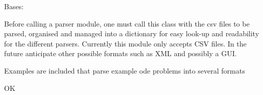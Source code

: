 \documentclass[letterpaper,10pt,english]{sphinxmanual}
\begin{document}
\begin{fulllineitems}
\label{eqparse:eqparse.createlibrary.CreateLibrary}
Bases: 

Before calling a parser module, one must call this class with the csv
files to be parsed, organised and managed into a dictionary for easy look-up
and readability for the different parsers. Currently this module only accepts 
CSV files. In the future anticipate other possible formats such as XML and
possibly a GUI.

Examples are included that parse example ode problems into several formats

OK

\begin{fulllineitems}
\label{eqparse:eqparse.createlibrary.CreateLibrary.add_index}
\end{fulllineitems}


\begin{fulllineitems}
\label{eqparse:eqparse.createlibrary.CreateLibrary.add_variable}
\end{fulllineitems}


\begin{fulllineitems}
\label{eqparse:eqparse.createlibrary.CreateLibrary.change_variable}
\end{fulllineitems}


\begin{fulllineitems}
\label{eqparse:eqparse.createlibrary.CreateLibrary.complete}
\end{fulllineitems}



\end{fulllineitems}
\end{document}
